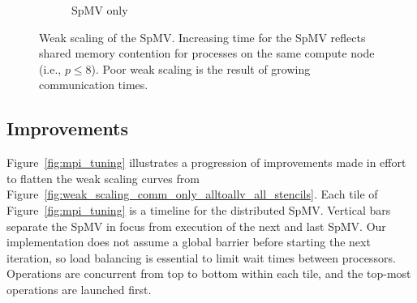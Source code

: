 \documentclass{report}
\begin{document}
\begin{figure}
\begin{subfigure}{0.48\textwidth}
\caption{SpMV only}
\label{fig:weak_scaling_spmv_only_alltoallv_all_stencils}
\end{subfigure}
\caption{Weak scaling of the SpMV. Increasing time for the SpMV reflects shared memory contention for processes on the same compute node (i.e., $p\leq 8$). Poor weak scaling is the result of growing communication times. }
\end{figure}


\subsection{Improvements}


Figure~\ref{fig:mpi_tuning} illustrates a progression of improvements made in effort to flatten the weak scaling curves from Figure~\ref{fig:weak_scaling_comm_only_alltoallv_all_stencils}. Each tile of Figure~\ref{fig:mpi_tuning} is a timeline for the distributed SpMV. Vertical bars separate the SpMV in focus from execution of the next and last SpMV. Our implementation does not assume a global barrier before starting the next iteration, so load balancing is essential to limit wait times between processors. Operations are concurrent from top to bottom within each tile, and the top-most operations are launched first.

\end{document}
